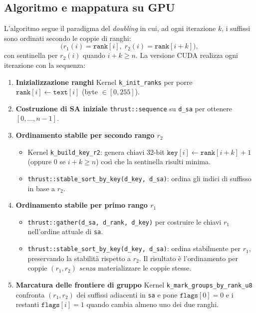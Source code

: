 		\subsection{Algoritmo e mappatura su GPU}
			L'algoritmo segue il paradigma del \emph{doubling} in cui, ad ogni iterazione $k$, i suffissi sono ordinati secondo le coppie di ranghi:
			\[
				\big(r_1(i)=\texttt{rank}[i],\; r_2(i)=\texttt{rank}[i+k]\big),
			\]
			con sentinella per $r_2(i)$ quando $i+k \ge n$.
			La versione CUDA realizza ogni iterazione con la sequenza:
			\begin{enumerate}
				\item \textbf{Inizializzazione ranghi}
				Kernel \texttt{k\_init\_ranks} per porre \(\texttt{rank}[i] \leftarrow \texttt{text}[i]\) (byte $\in [0,255]$).
				
				\item \textbf{Costruzione di SA iniziale}
				\texttt{thrust::sequence} su \texttt{d\_sa} per ottenere \([0,\dots,n{-}1]\).
				
				\item \textbf{Ordinamento stabile per secondo rango $r_2$}
				\begin{itemize}
					\item Kernel \texttt{k\_build\_key\_r2}: genera chiavi 32-bit \(\texttt{key}[i] \leftarrow \texttt{rank}[i{+}k]{+}1\) (oppure \(0\) se \(i{+}k\ge n\)) così che la sentinella risulti minima.
					\item \texttt{thrust::stable\_sort\_by\_key(d\_key, d\_sa)}: ordina gli indici di suffisso in base a \(r_2\).
				\end{itemize}
				
				\item \textbf{Ordinamento stabile per primo rango $r_1$}
				\begin{itemize}
					\item \texttt{thrust::gather(d\_sa, d\_rank, d\_key)} per costruire le chiavi \(r_1\) nell'ordine attuale di \texttt{sa}.
					\item \texttt{thrust::stable\_sort\_by\_key(d\_key, d\_sa)}: ordina stabilmente per \(r_1\), preservando la stabilità rispetto a \(r_2\).
					Il risultato è l'ordinamento per coppie \((r_1,r_2)\) \emph{senza} materializzare le coppie stesse.
				\end{itemize}
				
				\item \textbf{Marcatura delle frontiere di gruppo}
				Kernel \texttt{k\_mark\_groups\_by\_rank\_u8} confronta \((r_1,r_2)\) dei suffissi adiacenti in \texttt{sa} e pone \(\texttt{flags}[0]{=}0\) e i restanti \(\texttt{flags}[i]{=}1\) quando cambia almeno uno dei due ranghi.
				

\end{enumerate}
